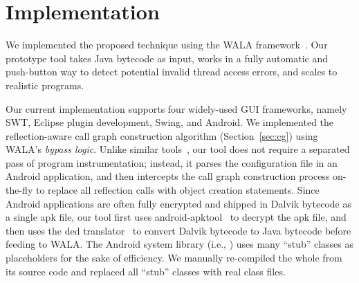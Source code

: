 \section{Implementation}
\label{sec:implementation}

We implemented the proposed technique using the WALA framework~\cite{walatutorial}.
Our prototype tool takes Java bytecode as input, works in a fully
automatic and push-button way to detect potential invalid thread access
errors, and scales to realistic programs.  


Our current implementation supports four widely-used GUI frameworks, namely
SWT, Eclipse plugin development, Swing, and Android.
We implemented the reflection-aware call graph construction
 algorithm (Section~\ref{sec:cg}) using WALA's \textit{bypass logic}.
Unlike similar tools~\cite{Payet:2011:SAA:2032266.2032299}, our tool
does not require a separated
pass of program instrumentation; instead, it
parses the configuration file in an Android application,
and then intercepts the call graph construction
process on-the-fly to replace all reflection calls with object creation statements.
Since Android applications are often fully encrypted and shipped in Dalvik
bytecode as a single apk file, our tool first uses
android-apktool~\cite{apktool} to
decrypt the apk file, and then uses the 
ded translator~\cite{ded} to convert
Dalvik bytecode to Java bytecode before feeding to WALA.  The Android system
library (i.e., ) uses many ``stub'' classes as
placeholders for the sake of efficiency. We manually re-compiled the whole
 from its source code and replaced all ``stub'' classes
with real class files.


